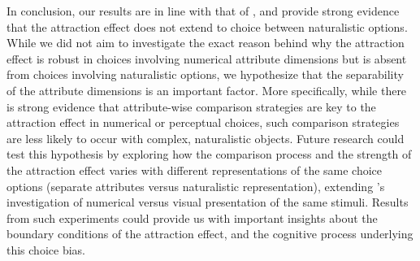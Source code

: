 \documentclass[12pt, a4paper]{article}
\begin{document}
In conclusion, our results are in line with that of , and provide strong evidence that the attraction effect does not extend to choice between naturalistic options. While we did not aim to investigate the exact reason behind why the attraction effect is robust in choices involving numerical attribute dimensions but is absent from choices involving naturalistic options, we hypothesize that the separability of the attribute dimensions is an important factor. More specifically, while there is strong evidence that attribute-wise comparison strategies are key to the attraction effect in numerical or perceptual choices, such comparison strategies are less likely to occur with complex, naturalistic objects. Future research could test this hypothesis by exploring how the comparison process and the strength of the attraction effect varies with different representations of the same choice options (separate attributes versus naturalistic representation), extending \citeauthor{Frederick2014}'s investigation of numerical versus visual presentation of the same stimuli. Results from such experiments could provide us with important insights about the boundary conditions of the attraction effect, and the cognitive process underlying this choice bias.









\newpage


\end{document}
